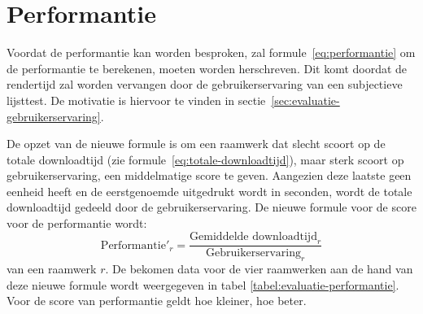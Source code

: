 \section{Performantie}
\label{sec:evaluatie-performantie}

Voordat de performantie kan worden besproken, zal formule~\ref{eq:performantie} om de performantie te berekenen, moeten worden herschreven.
Dit komt doordat de rendertijd zal worden vervangen door de gebruikerservaring van een subjectieve lijsttest.
De motivatie is hiervoor te vinden in sectie~\ref{sec:evaluatie-gebruikerservaring}. 

De opzet van de nieuwe formule is om een raamwerk dat slecht scoort op de totale downloadtijd (zie formule~\ref{eq:totale-downloadtijd}), maar sterk scoort op gebruikerservaring, een middelmatige score te geven.
Aangezien deze laatste geen eenheid heeft en de eerstgenoemde uitgedrukt wordt in seconden, wordt de totale downloadtijd gedeeld door de gebruikerservaring. De nieuwe formule voor de score voor de performantie wordt:
\begin{equation}
  \text{Performantie}'_r = \frac{\text{Gemiddelde downloadtijd}_r}{\text{Gebruikerservaring}_r}
  \label{eq:performantie-enhanced}
\end{equation}
van een raamwerk $r$. 
De bekomen data voor de vier raamwerken aan de hand van deze nieuwe formule wordt weergegeven in tabel \ref{tabel:evaluatie-performantie}.
Voor de score van performantie geldt hoe kleiner, hoe beter.
\begin{table}[H]
\centering
{}
\caption{Overzicht van performantie voor \st{}~(\sta), \kendo{}~(\kendoa), \jqm{}~(\jqma) en \lungo{}~(\lungoa). Minder is beter.}
\label{tabel:evaluatie-performantie}
\end{table}

